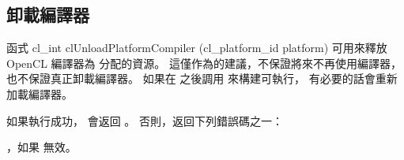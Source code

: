 \subsection{卸載編譯器}

函式
\startclc
cl_int clUnloadPlatformCompiler (cl_platform_id platform)
\stopclc
可用來釋放 OpenCL 編譯器為  分配的資源。
這僅作為的建議，不保證將來不再使用編譯器，也不保證真正卸載編譯器。
如果在  之後調用
  來構建可執行，
有必要的話會重新加載編譯器。

如果執行成功，  會返回 。
否則，返回下列錯誤碼之一：
\startigBase
\item {}，如果  無效。
\stopigBase

